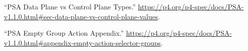 \documentclass[11pt]{article}
\begin{document}
{{\begin{thebibliography}{35}
\mdbibitemlabel{{}[22]}\textquotedblleft{}PSA Data Plane vs Control Plane Types.\textquotedblright{} \href{https://p4.org/p4-spec/docs/PSA-v1.1.0.html\%23sec-data-plane-vs-control-plane-values}{{\ttfamily https://\hspace{0pt}p4.\hspace{0pt}org/\hspace{0pt}p4-\hspace{0pt}spec/\hspace{0pt}docs/\hspace{0pt}PSA-\hspace{0pt}v1.\hspace{0pt}1.\hspace{0pt}0.\hspace{0pt}html\#\hspace{0pt}sec-\hspace{0pt}data-\hspace{0pt}plane-\hspace{0pt}vs-\hspace{0pt}control-\hspace{0pt}plane-\hspace{0pt}values}}.\label{psatranslation}%

\mdbibitemlabel{{}[23]}\textquotedblleft{}PSA Empty Group Action Appendix.\textquotedblright{} \href{https://p4.org/p4-spec/docs/PSA-v1.1.0.html\%23appendix-empty-action-selector-groups}{{\ttfamily https://\hspace{0pt}p4.\hspace{0pt}org/\hspace{0pt}p4-\hspace{0pt}spec/\hspace{0pt}docs/\hspace{0pt}PSA-\hspace{0pt}v1.\hspace{0pt}1.\hspace{0pt}0.\hspace{0pt}html\#\hspace{0pt}appendix-\hspace{0pt}empty-\hspace{0pt}action-\hspace{0pt}selector-\hspace{0pt}groups}}.\label{psaemptygroupactionappendix}%


\end{thebibliography}}}
\end{document}
